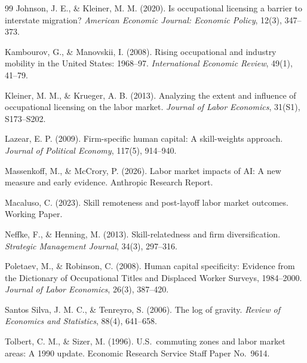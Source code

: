 \documentclass[12pt]{article}
\begin{document}
\begin{thebibliography}{99}
Johnson, J. E., \& Kleiner, M. M. (2020).
Is occupational licensing a barrier to interstate migration?
\textit{American Economic Journal: Economic Policy}, 12(3), 347--373.

Kambourov, G., \& Manovskii, I. (2008).
Rising occupational and industry mobility in the United States: 1968--97.
\textit{International Economic Review}, 49(1), 41--79.

Kleiner, M. M., \& Krueger, A. B. (2013).
Analyzing the extent and influence of occupational licensing on the labor market.
\textit{Journal of Labor Economics}, 31(S1), S173--S202.

Lazear, E. P. (2009).
Firm-specific human capital: A skill-weights approach.
\textit{Journal of Political Economy}, 117(5), 914--940.

Massenkoff, M., \& McCrory, P. (2026).
Labor market impacts of AI: A new measure and early evidence.
Anthropic Research Report.

Macaluso, C. (2023).
Skill remoteness and post-layoff labor market outcomes.
Working Paper.

Neffke, F., \& Henning, M. (2013).
Skill-relatedness and firm diversification.
\textit{Strategic Management Journal}, 34(3), 297--316.

Poletaev, M., \& Robinson, C. (2008).
Human capital specificity: Evidence from the Dictionary of Occupational Titles and Displaced Worker Surveys, 1984--2000.
\textit{Journal of Labor Economics}, 26(3), 387--420.

Santos Silva, J. M. C., \& Tenreyro, S. (2006).
The log of gravity.
\textit{Review of Economics and Statistics}, 88(4), 641--658.

Tolbert, C. M., \& Sizer, M. (1996).
U.S.\ commuting zones and labor market areas: A 1990 update.
Economic Research Service Staff Paper No.\ 9614.

\end{thebibliography}
\end{document}

